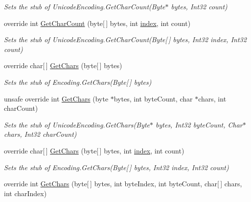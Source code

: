 \begin{DoxyCompactItemize}
\begin{DoxyCompactList}\small\item\em Sets the stub of Unicode\-Encoding.\-Get\-Char\-Count(\-Byte$\ast$ bytes, Int32 count)\end{DoxyCompactList}\item 
override int \hyperlink{class_system_1_1_text_1_1_fakes_1_1_stub_unicode_encoding_acda35e0e6dcff955c70eaf7d9c5a6e03}{Get\-Char\-Count} (byte\mbox{[}$\,$\mbox{]} bytes, int \hyperlink{jquery-1_810_82-vsdoc_8js_a75bb12d1f23302a9eea93a6d89d0193e}{index}, int count)
\begin{DoxyCompactList}\small\item\em Sets the stub of Unicode\-Encoding.\-Get\-Char\-Count(\-Byte\mbox{[}$\,$\mbox{]} bytes, Int32 index, Int32 count)\end{DoxyCompactList}\item 
override char\mbox{[}$\,$\mbox{]} \hyperlink{class_system_1_1_text_1_1_fakes_1_1_stub_unicode_encoding_ab76fe0f4d1976d42d3cf2cd00fda59d8}{Get\-Chars} (byte\mbox{[}$\,$\mbox{]} bytes)
\begin{DoxyCompactList}\small\item\em Sets the stub of Encoding.\-Get\-Chars(\-Byte\mbox{[}$\,$\mbox{]} bytes)\end{DoxyCompactList}\item 
unsafe override int \hyperlink{class_system_1_1_text_1_1_fakes_1_1_stub_unicode_encoding_acd53e81dc30f8f0dd81e3a89802d7e4c}{Get\-Chars} (byte $\ast$bytes, int byte\-Count, char $\ast$chars, int char\-Count)
\begin{DoxyCompactList}\small\item\em Sets the stub of Unicode\-Encoding.\-Get\-Chars(\-Byte$\ast$ bytes, Int32 byte\-Count, Char$\ast$ chars, Int32 char\-Count)\end{DoxyCompactList}\item 
override char\mbox{[}$\,$\mbox{]} \hyperlink{class_system_1_1_text_1_1_fakes_1_1_stub_unicode_encoding_ab6dd1c8b103af564e6e8a71f0244f8e5}{Get\-Chars} (byte\mbox{[}$\,$\mbox{]} bytes, int \hyperlink{jquery-1_810_82-vsdoc_8js_a75bb12d1f23302a9eea93a6d89d0193e}{index}, int count)
\begin{DoxyCompactList}\small\item\em Sets the stub of Encoding.\-Get\-Chars(\-Byte\mbox{[}$\,$\mbox{]} bytes, Int32 index, Int32 count)\end{DoxyCompactList}\item 
override int \hyperlink{class_system_1_1_text_1_1_fakes_1_1_stub_unicode_encoding_a1a98b5b483df8473eff2f1787966bc83}{Get\-Chars} (byte\mbox{[}$\,$\mbox{]} bytes, int byte\-Index, int byte\-Count, char\mbox{[}$\,$\mbox{]} chars, int char\-Index)

\end{DoxyCompactItemize}

